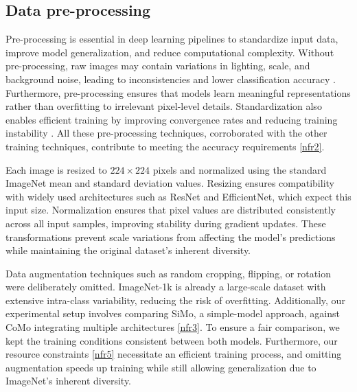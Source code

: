 \subsection{Data pre-processing}\label{sec:implementation:augmentation}
%
Pre-processing is essential in deep learning pipelines to standardize input data, improve model generalization, and reduce computational complexity. Without pre-processing, raw images may contain variations in lighting, scale, and background noise, leading to inconsistencies and lower classification accuracy \cite{DBLP:journals/pieee/LeCunBBH98}. Furthermore, pre-processing ensures that models learn meaningful representations rather than overfitting to irrelevant pixel-level details. Standardization also enables efficient training by improving convergence rates and reducing training instability \cite{DBLP:journals/cacm/KrizhevskySH17}. All these pre-processing techniques, corroborated with the other training techniques, contribute to meeting the accuracy requirements \ref{nfr2}.

%
Each image is resized to $224 \times 224$ pixels and normalized using the standard ImageNet mean and standard deviation values. Resizing ensures compatibility with widely used architectures such as ResNet and EfficientNet, which expect this input size. Normalization ensures that pixel values are distributed consistently across all input samples, improving stability during gradient updates. These transformations prevent scale variations from affecting the model’s predictions while maintaining the original dataset's inherent diversity.

%
Data augmentation techniques such as random cropping, flipping, or rotation were deliberately omitted. ImageNet-1k is already a large-scale dataset with extensive intra-class variability, reducing the risk of overfitting. Additionally, our experimental setup involves comparing SiMo, a simple-model approach, against CoMo integrating multiple architectures \ref{nfr3}. To ensure a fair comparison, we kept the training conditions consistent between both models. Furthermore, our resource constraints \ref{nfr5} necessitate an efficient training process, and omitting augmentation speeds up training while still allowing generalization due to ImageNet’s inherent diversity.

